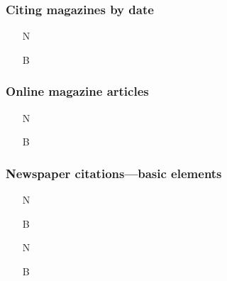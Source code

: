 \documentclass[11pt,letterpaper,oneside]{article}
\begin{document}
\setcounter{subsubsection}{198}
\subsubsection{Citing magazines by date}

\begin{itemize}
\item[N] 

\item[B] 
\end{itemize}

\subsubsection{Online magazine articles}

\begin{itemize}
\item[N] 

\item[B] 
\end{itemize}


\setcounter{subsubsection}{202}
\subsubsection{Newspaper citations---basic elements}

\begin{itemize}
\item[N] 

\item[B] 

\item[N] 

\item[B] 
\end{itemize}


\setcounter{subsubsection}{206}
\end{document}
